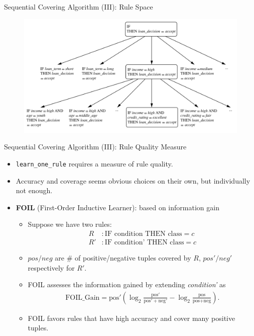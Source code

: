 \begin{frame}{Sequential Covering Algorithm (III): Rule Space}
	\vspace*{-1em}
	\begin{figure}[h]
		\centering
		\includegraphics[height=0.8\textheight]{img/7-classification_rule_space.png}
	\end{figure}
\end{frame}

\begin{frame}{Sequential Covering Algorithm (III): Rule Quality Measure}
	\begin{itemize}
		\item \texttt{learn\_one\_rule} requires a measure of rule quality.
		\item Accuracy and coverage seems obvious choices on their own, but
		      individually not enough.
		\item \textbf{FOIL} (First-Order Inductive Learner): based on information gain
		      \begin{itemize}
			      \item Suppose we have two rules:
			            \begin{align*}
				            \label{}
				            R  & : \text{IF condition THEN class} = c  \\
				            R' & : \text{IF condition' THEN class} = c
			            \end{align*}
			      \item $pos/neg$ are $\#$ of positive/negative tuples covered by $R$, $pos'/neg'$ respectively for $R'$.
			      \item FOIL assesses the information gained by extending \textit{condition'} as
			            \begin{align*}
				            \text{FOIL\_Gain} = \text{pos}' \left( \log_2 \frac{\text{pos}'}{\text{pos}' + \text{neg}'} - \log_2 \frac{\text{pos}}{\text{pos}+\text{neg}} \right).
			            \end{align*}
			      \item FOIL favors rules that have high accuracy and cover many positive tuples.
		      \end{itemize}
	\end{itemize}
\end{frame}

